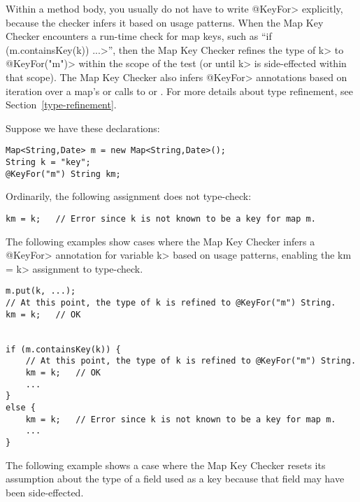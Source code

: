 Within a method body, you usually do not have to write \<@KeyFor> explicitly,
because the checker infers it based on usage patterns.  When the Map Key
Checker encounters a run-time check for map keys, such as
``\<if (m.containsKey(k)) ...>'', then the Map Key Checker refines the type of
\<k> to \<@KeyFor("m")> within the scope of the test (or until \<k> is
side-effected within that scope).  The Map Key Checker also infers \<@KeyFor>
annotations based on iteration over a map's
 or calls to
or
.
For more details about type refinement, see Section~\ref{type-refinement}.

Suppose we have these declarations:

\begin{verbatim}
Map<String,Date> m = new Map<String,Date>();
String k = "key";
@KeyFor("m") String km;
\end{verbatim}

Ordinarily, the following assignment does not type-check:

\begin{verbatim}
km = k;   // Error since k is not known to be a key for map m.
\end{verbatim}

The following examples show cases where the Map Key Checker
infers a \<@KeyFor> annotation for variable \<k> based on usage patterns,
enabling the \<km = k> assignment to type-check.


\begin{verbatim}
m.put(k, ...);
// At this point, the type of k is refined to @KeyFor("m") String.
km = k;   // OK


if (m.containsKey(k)) {
    // At this point, the type of k is refined to @KeyFor("m") String.
    km = k;   // OK
    ...
}
else {
    km = k;   // Error since k is not known to be a key for map m.
    ...
}
\end{verbatim}


The following example shows a case where the Map Key Checker resets its
assumption about the type of a field used as a key because that field may have
been side-effected.

